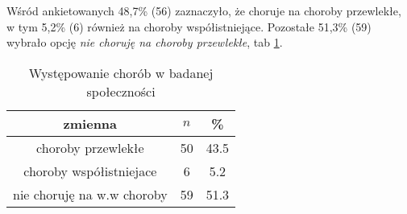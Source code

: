 Wśród ankietowanych 48,7\% (56) zaznaczyło, że choruje na choroby przewlekłe, w tym 5,2\% (6) również na choroby współistniejące. Pozostałe 51,3\% (59) wybrało opcję  \textit{nie choruję na choroby przewlekłe}, tab \ref{tab:Q33}.

\begin{table}[H]
\caption{Występowanie chorób w badanej społeczności}
\centering
\begin{tabular}{ | c | c | c |}
\hline
zmienna & $n$ & \% \\
\hline
choroby przewlekłe  &  50  & 43.5 \\
\hline
choroby współistniejace  &  6  & 5.2\\
\hline
nie choruję na w.w choroby  &  59  & 51.3 \\
\hline
\end{tabular}
\label{tab:Q33}
\end{table}
